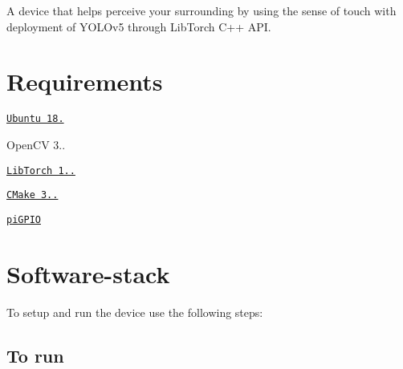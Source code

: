A device that helps perceive your surrounding by using the sense of touch with deployment of Y\+O\+L\+Ov5 through Lib\+Torch C++ A\+PI.

\section*{Requirements}


\begin{DoxyItemize}
\item \href{https://www.instructables.com/Install-Ubuntu-18044-LTS-on-Your-Raspberry-Pi-Boar/}{\tt Ubuntu 18.}
\item Open\+CV 3..
\item \href{https://download.pytorch.org/libtorch/nightly/cpu/libtorch-shared-with-deps-latest.zip}{\tt Lib\+Torch 1..}
\item \href{https://askubuntu.com/questions/355565/how-do-i-install-the-latest-version-of-cmake-from-the-command-line}{\tt C\+Make 3..}
\item \href{https://abyz.me.uk/rpi/pigpio/download.html}{\tt pi\+G\+P\+IO}
\end{DoxyItemize}

\section*{Software-\/stack}

To setup and run the device use the following steps\+:

\subsection*{To run}


